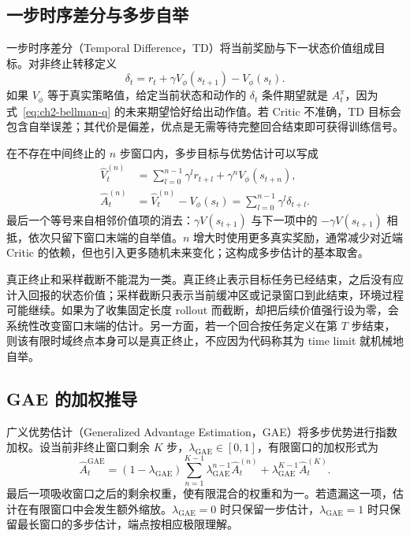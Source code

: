 \subsection{一步时序差分与多步自举}
\label{sec:ch2-td}

一步时序差分（Temporal Difference，TD）将当前奖励与下一状态价值组成目标。对非终止转移定义
\begin{equation}
    \delta_t=r_t+\gamma V_\phi(s_{t+1})-V_\phi(s_t).
    \label{eq:ch2-td-error}
\end{equation}
如果 $V_\phi$ 等于真实策略值，给定当前状态和动作的 $\delta_t$ 条件期望就是 $A_t^\pi$，因为式~\eqref{eq:ch2-bellman-q} 的未来期望恰好给出动作值。若 Critic 不准确，TD 目标会包含自举误差；其代价是偏差，优点是无需等待完整回合结束即可获得训练信号。

在不存在中间终止的 $n$ 步窗口内，多步目标与优势估计可以写成
\begin{align}
    \widehat V_t^{(n)}&=\sum_{l=0}^{n-1}\gamma^l r_{t+l}
          +\gamma^n V_\phi(s_{t+n}),
    \label{eq:ch2-nstep-target}\\
    \widehat A_t^{(n)}&=\widehat V_t^{(n)}-V_\phi(s_t)
          =\sum_{l=0}^{n-1}\gamma^l\delta_{t+l}.
    \label{eq:ch2-nstep-advantage}
\end{align}
最后一个等号来自相邻价值项的消去：$\gamma V(s_{t+1})$ 与下一项中的 $-\gamma V(s_{t+1})$ 相抵，依次只留下窗口末端的自举值。$n$ 增大时使用更多真实奖励，通常减少对近端 Critic 的依赖，但也引入更多随机未来变化；这构成多步估计的基本取舍。

真正终止和采样截断不能混为一类。真正终止表示目标任务已经结束，之后没有应计入回报的状态价值；采样截断只表示当前缓冲区或记录窗口到此结束，环境过程可能继续。如果为了收集固定长度 rollout 而截断，却把后续价值强行设为零，会系统性改变窗口末端的估计。另一方面，若一个回合按任务定义在第 $T$ 步结束，则该有限时域终点本身可以是真正终止，不应因为代码称其为 time limit 就机械地自举。

\subsection{GAE 的加权推导}
\label{sec:ch2-gae-derivation}

广义优势估计（Generalized Advantage Estimation，GAE）将多步优势进行指数加权\cite{schulman2015high}。设当前非终止窗口剩余 $K$ 步，$\lambda_{\mathrm{GAE}}\in[0,1]$，有限窗口的加权形式为
\begin{equation}
    \widehat A_t^{\mathrm{GAE}}
    =(1-\lambda_{\mathrm{GAE}})\sum_{n=1}^{K-1}
       \lambda_{\mathrm{GAE}}^{n-1}\widehat A_t^{(n)}
       +\lambda_{\mathrm{GAE}}^{K-1}\widehat A_t^{(K)}.
    \label{eq:ch2-gae-mixture}
\end{equation}
最后一项吸收窗口之后的剩余权重，使有限混合的权重和为一。若遗漏这一项，估计在有限窗口中会发生额外缩放。$\lambda_{\mathrm{GAE}}=0$ 时只保留一步估计，$\lambda_{\mathrm{GAE}}=1$ 时只保留最长窗口的多步估计，端点按相应极限理解。

